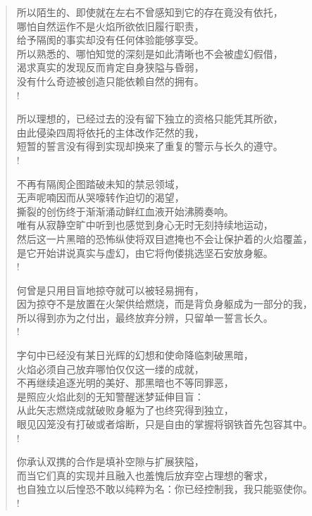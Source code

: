 \documentclass[UTF8, 12pt, a4paper]{ctexrep} %
\begin{document}
\begin{verse}
所以陌生的、即使就在左右不曾感知到它的存在竟没有依托，\\
哪怕自然运作不是火焰所欲依旧履行职责，\\
给予隔阂的事实却没有任何体验能够享受。\\
所以熟悉的、哪怕知觉的深刻是如此清晰也不会被虚幻假借，\\
渴求真实的发现反而肯定自身狭隘与昏弱，\\
没有什么奇迹被创造只能依赖自然的拥有。\\!

所以理想的，已经过去的没有留下独立的资格只能凭其所欲，\\
由此侵染四周将依托的主体改作茫然的我，\\
短暂的誓言没有得到实现却换来了重复的警示与长久的遵守。\\!

不再有隔阂企图踏破未知的禁忌领域，\\
无声呢喃因而从哭嚎转作迫切的渴望，\\
撕裂的创伤终于渐渐涌动鲜红血液开始沸腾奏响。\\
唯有从寂静空旷中听到也感觉到身心无时无刻持续地运动，\\
然后这一片黑暗的恐怖纵使将双目遮掩也不会让保护着的火焰覆盖，\\
是它开始讲说真实与虚幻，由它将佝偻挑选坚石安放身躯。\\!

何曾是只用目盲地掠夺就可以被轻易拥有，\\
因为掠夺不是放置在火架供给燃烧，而是背负身躯成为一部分的我，\\
所以得到亦为之付出，最终放弃分辨，只留单一誓言长久。\\!

字句中已经没有某日光辉的幻想和使命降临刺破黑暗，\\
火焰必须自己放弃哪怕仅仅这一缕的成就，\\
不再继续追逐光明的美好、那黑暗也不等同罪恶，\\
是照应火焰此刻的无知警醒迷梦延伸目盲：\\
从此矢志燃烧成就破败身躯为了也终究得到独立，\\
眼见囚笼没有打破或者熔断，只是自由的掌握将钢铁首先包容其中。\\!

你承认双携的合作是填补空隙与扩展狭隘，\\
而当它们真的实现并且融入也羞愧后放弃空占理想的奢求，\\
也自独立以后惶恐不敢以纯粹为名：你已经控制我，我只能驱使你。\\!


\end{verse}
\end{document}
